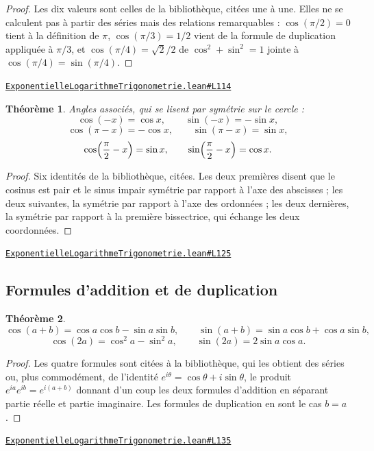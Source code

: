 \documentclass[11pt,a4paper]{article}
\theoremstyle{definition}
\theoremstyle{plain}
\newtheorem{theoreme}{Théorème}
\newcommand{\source}[2]{\par\smallskip\noindent\hfill{\footnotesize\href{#1}{\texttt{#2}}}\par\smallskip}
\begin{document}
\begin{proof}
Les dix valeurs sont celles de la bibliothèque, citées une à une. Elles ne se calculent pas
à partir des séries mais des relations remarquables : $\cos(\pi/2) = 0$ tient à la
définition de $\pi$, $\cos(\pi/3) = 1/2$ vient de la formule de duplication appliquée à
$\pi/3$, et $\cos(\pi/4) = \sqrt{2}/2$ de $\cos^{2} + \sin^{2} = 1$ jointe à
$\cos(\pi/4) = \sin(\pi/4)$.
\end{proof}
\source{https://github.com/Commutator-IO/learn-lean/blob/main/cours/02-lycee/05-exponentielle-logarithme-trigonometrie/ExponentielleLogarithmeTrigonometrie.lean\#L114}{ExponentielleLogarithmeTrigonometrie.lean\#L114}

\begin{theoreme}
Angles associés, qui se lisent par symétrie sur le cercle :
\[ \cos(-x) = \cos x, \qquad \sin(-x) = -\sin x, \]
\[ \cos(\pi - x) = -\cos x, \qquad \sin(\pi - x) = \sin x, \]
\[ \cos\Bigl(\frac{\pi}{2} - x\Bigr) = \sin x, \qquad
   \sin\Bigl(\frac{\pi}{2} - x\Bigr) = \cos x . \]
\end{theoreme}

\begin{proof}
Six identités de la bibliothèque, citées. Les deux premières disent que le cosinus est pair
et le sinus impair \textemdash{} symétrie par rapport à l'axe des abscisses ; les deux
suivantes, la symétrie par rapport à l'axe des ordonnées ; les deux dernières, la symétrie
par rapport à la première bissectrice, qui échange les deux coordonnées.
\end{proof}
\source{https://github.com/Commutator-IO/learn-lean/blob/main/cours/02-lycee/05-exponentielle-logarithme-trigonometrie/ExponentielleLogarithmeTrigonometrie.lean\#L125}{ExponentielleLogarithmeTrigonometrie.lean\#L125}

\subsection{Formules d'addition et de duplication}

\begin{theoreme}
\[ \cos(a + b) = \cos a \cos b - \sin a \sin b, \qquad
   \sin(a + b) = \sin a \cos b + \cos a \sin b, \]
\[ \cos(2a) = \cos^{2} a - \sin^{2} a, \qquad \sin(2a) = 2 \sin a \cos a . \]
\end{theoreme}

\begin{proof}
Les quatre formules sont citées à la bibliothèque, qui les obtient des séries \textemdash{}
ou, plus commodément, de l'identité $e^{i\theta} = \cos\theta + i\sin\theta$, le produit
$e^{ia}e^{ib} = e^{i(a+b)}$ donnant d'un coup les deux formules d'addition en séparant
partie réelle et partie imaginaire. Les formules de duplication en sont le cas $b = a$.
\end{proof}
\source{https://github.com/Commutator-IO/learn-lean/blob/main/cours/02-lycee/05-exponentielle-logarithme-trigonometrie/ExponentielleLogarithmeTrigonometrie.lean\#L135}{ExponentielleLogarithmeTrigonometrie.lean\#L135}
\end{document}
